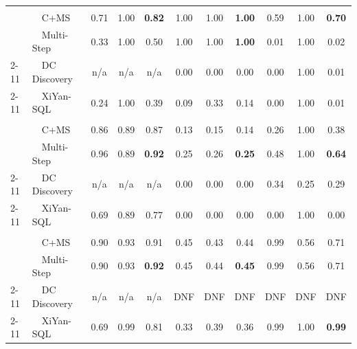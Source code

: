 \begin{tabular}{llccccccccc}
\midrule
\addlinespace[2pt]
\multicolumn{11}{c}{\textbf{Tax}} \\
\addlinespace[1pt]
\multirow{2}{*}{\system} & ~~C+MS & 0.71 & 1.00 & \textbf{0.82} & 1.00 & 1.00 & \textbf{1.00} & 0.59 & 1.00 & \textbf{0.70} \\
 & ~~Multi-Step & 0.33 & 1.00 & 0.50 & 1.00 & 1.00 & \textbf{1.00} & 0.01 & 1.00 & 0.02 \\
\cmidrule(l){2-11}
\multirow{1}{*}{Profiling} & ~~DC Discovery & n/a & n/a & n/a & 0.00 & 0.00 & 0.00 & 0.00 & 1.00 & 0.01 \\
\cmidrule(l){2-11}
\multirow{1}{*}{Text2SQL} & ~~XiYan-SQL & 0.24 & 1.00 & 0.39 & 0.09 & 0.33 & 0.14 & 0.00 & 1.00 & 0.01 \\
\midrule
\addlinespace[2pt]
\multicolumn{11}{c}{\textbf{HMDAZ}} \\
\addlinespace[1pt]
\multirow{2}{*}{\system} & ~~C+MS & 0.86 & 0.89 & 0.87 & 0.13 & 0.15 & 0.14 & 0.26 & 1.00 & 0.38 \\
 & ~~Multi-Step & 0.96 & 0.89 & \textbf{0.92} & 0.25 & 0.26 & \textbf{0.25} & 0.48 & 1.00 & \textbf{0.64} \\
\cmidrule(l){2-11}
\multirow{1}{*}{Profiling} & ~~DC Discovery & n/a & n/a & n/a & 0.00 & 0.00 & 0.00 & 0.34 & 0.25 & 0.29 \\
\cmidrule(l){2-11}
\multirow{1}{*}{Text2SQL} & ~~XiYan-SQL & 0.69 & 0.89 & 0.77 & 0.00 & 0.00 & 0.00 & 0.00 & 1.00 & 0.00 \\
\midrule
\addlinespace[2pt]
\multicolumn{11}{c}{\textbf{HMDA Checks}} \\
\addlinespace[1pt]
\multirow{2}{*}{\system} & ~~C+MS & 0.90 & 0.93 & 0.91 & 0.45 & 0.43 & 0.44 & 0.99 & 0.56 & 0.71 \\
 & ~~Multi-Step & 0.90 & 0.93 & \textbf{0.92} & 0.45 & 0.44 & \textbf{0.45} & 0.99 & 0.56 & 0.71 \\
\cmidrule(l){2-11}
\multirow{1}{*}{Profiling} & ~~DC Discovery & n/a & n/a & n/a & DNF & DNF & DNF & DNF & DNF & DNF \\
\cmidrule(l){2-11}
\multirow{1}{*}{Text2SQL} & ~~XiYan-SQL & 0.69 & 0.99 & 0.81 & 0.33 & 0.39 & 0.36 & 0.99 & 1.00 & \textbf{0.99} \\
\bottomrule
\end{tabular}
